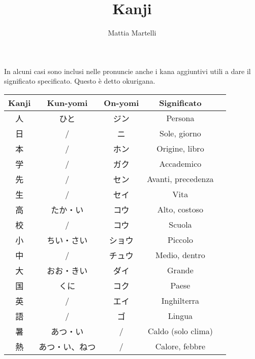 \documentclass{article}
\title{Kanji}
\author{Mattia Martelli}
\date{}
\let\ita\textitalian
\newcommand{\itabf}[1]{\ita{\textbf{#1}}}
\begin{document}
    
    \maketitle

    In alcuni casi sono inclusi nelle pronuncie anche i kana aggiuntivi utili a dare il significato specificato.
    Questo è detto okurigana.

    \begin{center}
        \begin{japanese}
            \begin{longtable}{|c|c|c|c|c|}
                \hline
                \itabf{Kanji} & \itabf{Kun-yomi} & \itabf{On-yomi} & \itabf{Significato}\\
                \hline\hline
                人 & ひと & ジン & \ita{Persona}\\
                \hline
                日 & / & ニ & \ita{Sole, giorno}\\
                \hline
                本 & / & ホン & \ita{Origine, libro}\\
                \hline
                学 & / & ガク & \ita{Accademico}\\
                \hline
                先 & / & セン & \ita{Avanti, precedenza}\\
                \hline
                生 & / & セイ & \ita{Vita}\\
                \hline
                高 & たか・い & コウ & \ita{Alto, costoso}\\
                \hline
                校 & / & コウ & \ita{Scuola}\\
                \hline
                小 & ちい・さい & ショウ & \ita{Piccolo}\\
                \hline
                中 & / & チュウ & \ita{Medio, dentro}\\
                \hline
                大 & おお・きい & ダイ & \ita{Grande}\\
                \hline
                国 & くに & コク & \ita{Paese}\\
                \hline
                英 & / & エイ & \ita{Inghilterra}\\
                \hline
                語 & / & ゴ & \ita{Lingua}\\
                \hline
                暑 & あつ・い & / & \ita{Caldo (solo clima)}\\
                \hline
                熱 & あつ・い、ねつ & / & \ita{Calore, febbre}\\
                \hline
            \end{longtable}
        \end{japanese}
    \end{center}
\end{document}
